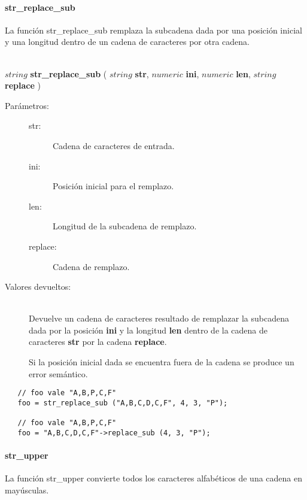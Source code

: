 \paragraph{str\_replace\_sub}
La función str\_replace\_sub remplaza la subcadena dada por una posición inicial y una longitud dentro de un cadena de caracteres por otra cadena.

\begin{framed}
\hfill \\ $string$ \textbf{str\_replace\_sub} ( $string$ \textbf{str}, $numeric$ \textbf{ini}, $numeric$ \textbf{len}, $string$ \textbf{replace} )  
\begin{description}
\item [Parámetros:] \hfill 
   \begin{description}
   \item[str:] Cadena de caracteres de entrada.
   \item[ini:] Posición inicial para el remplazo.
   \item[len:] Longitud de la subcadena de remplazo.
   \item[replace:] Cadena de remplazo.
   \end{description}
\item[Valores devueltos:] \hfill \\
   Devuelve un cadena de caracteres resultado de remplazar la subcadena dada por la posición \textbf{ini} y la longitud
   \textbf{len} dentro de la cadena de caracteres \textbf{str} por la cadena \textbf{replace}.
   
   Si la posición inicial dada se encuentra fuera de la cadena se produce un error semántico.
\end{description}
\end{framed}

\begin{lstlisting}
   // foo vale "A,B,P,C,F" 
   foo = str_replace_sub ("A,B,C,D,C,F", 4, 3, "P"); 
   
   // foo vale "A,B,P,C,F" 
   foo = "A,B,C,D,C,F"->replace_sub (4, 3, "P");
\end{lstlisting}

\paragraph{str\_upper}
La función str\_upper convierte todos los caracteres alfabéticos de una cadena en mayúsculas. 

